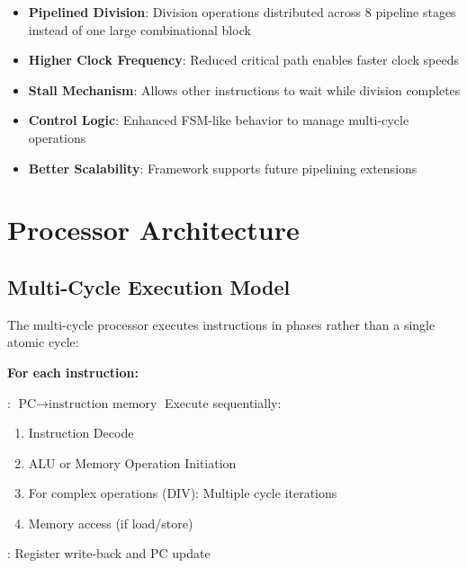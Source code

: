 \documentclass[a4paper, 11pt]{article}
\begin{document}
\begin{itemize}
    \item \textbf{Pipelined Division}: Division operations distributed across 8 pipeline stages instead of one large combinational block
    \item \textbf{Higher Clock Frequency}: Reduced critical path enables faster clock speeds
    \item \textbf{Stall Mechanism}: Allows other instructions to wait while division completes
    \item \textbf{Control Logic}: Enhanced FSM-like behavior to manage multi-cycle operations
    \item \textbf{Better Scalability}: Framework supports future pipelining extensions
\end{itemize}

\newpage

\section{Processor Architecture}

\subsection{Multi-Cycle Execution Model}

The multi-cycle processor executes instructions in phases rather than a single atomic cycle:

\begin{algorithm}[H]
\DontPrintSingleQuotedStrings
\DontPrintSemicolon
{}

\textbf{For each instruction:}

\Fetch{}: $\text{PC} \rightarrow \text{instruction memory}$\;
Execute sequentially:
\begin{enumerate}
    \item Instruction Decode
    \item ALU or Memory Operation Initiation
    \item For complex operations (DIV): Multiple cycle iterations
    \item Memory access (if load/store)
\end{enumerate}
\Complete{}: Register write-back and PC update\;

\caption{Multi-Cycle Instruction Execution}
\end{algorithm}
\end{document}

